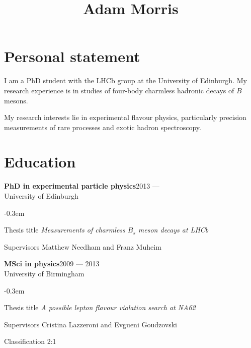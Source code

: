 \documentclass[contbibnum]{simplecv}
\title{Adam Morris}
\newcommand\dateditem[2]{#1\hfill#2\\}
\newcommand\topictitle[3]{\dateditem{{\textbf{#1}}}{#3}#2}
\def\typeface{phv}
\begin{document}
	\maketitle\vspace{-3em}
	\fontfamily{\typeface}\selectfont
	\section{Personal statement}
	I am a PhD student with the LHCb group at the University of Edinburgh.
	My research experience is in studies of four-body charmless hadronic decays of $B$ mesons.
	
	My research interests lie in experimental flavour physics, particularly precision measurements of rare processes and exotic hadron spectroscopy.
	
	
	\section{Education}
	\topictitle{PhD in experimental particle physics}{University of Edinburgh}{2013 ---}
	\begin{topic}
		\itemsep-0.3em
		\item[Thesis title]{\textit{Measurements of charmless $B_s$ meson decays at LHCb}}
		\item[Supervisors]{Matthew Needham and Franz Muheim}
	\end{topic}
	\topictitle{MSci in physics}{University of Birmingham}{2009 --- 2013}
	\begin{topic}
		\itemsep-0.3em
		\item[Thesis title]{\textit{A possible lepton flavour violation search at NA62}}
		\item[Supervisors]{Cristina Lazzeroni and Evgueni Goudzovski}
		\item[Classification]{2:1}
	\end{topic}
\end{document}
